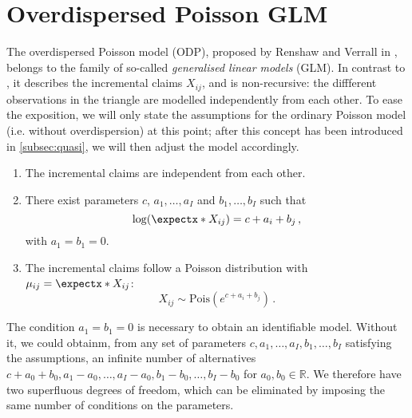 \documentclass[a4paper]{book}
\begin{document}
\chapter{Overdispersed Poisson GLM} \label{chapter:poisson}

The overdispersed Poisson model (ODP), proposed by Renshaw and Verrall in \cite{renshaw}, belongs to the family of so-called \emph{generalised linear models} (GLM). In contrast to , it describes the incremental claims $X_{ij}$, and is non-recursive: the diffferent observations in the triangle are modelled independently from each other. To ease the exposition, we will only state the assumptions for the ordinary Poisson model (i.e. without overdispersion) at this point; after this concept has been introduced in \cref{subsec:quasi}, we will then adjust the model accordingly.

\begin{model} \leavevmode \label{model:poisson}
  \begin{enumerate}[label=\bf{\textup{(}Pois\arabic*\textup{)}},ref=\textup{(}Pois\arabic*\textup{)}, wide]
    \item \label{assump:poisson1}
          The incremental claims are independent from each other.
    \item \label{assump:poisson2}
          There exist parameters $c$, $a_1, \dots, a_I$ and $b_1, \dots, b_I$ such that
          \begin{equation} \label{eq:linear-predictor-poisson}
            \log(\expect{X_{ij}}) = c + a_i + b_j \,,
          \end{equation}
          with $a_1 = b_1 = 0$.
    \item \label{assump:poisson3}
          The incremental claims follow a Poisson distribution with $\mu_{ij} = \expect{X_{ij}}$:
          \begin{equation}
            X_{ij} \sim \mathrm{Pois}(e^{c + a_i + b_j}) \,.
          \end{equation}
  \end{enumerate}
\end{model}

The condition $a_1 = b_1 = 0$ is necessary to obtain an identifiable model. Without it, we could obtainm, from any set of parameters $c, a_1, \dots, a_I, b_1, \dots, b_I$ satisfying the assumptions, an infinite number of alternatives $c + a_0 + b_0, a_1 - a_0, \dots, a_I - a_0, b_1 - b_0, \dots, b_I - b_0$ for $a_0, b_0 \in \mathbb{R}$. We therefore have two superfluous degrees of freedom, which can be eliminated by imposing the same number of conditions on the parameters.
\end{document}
